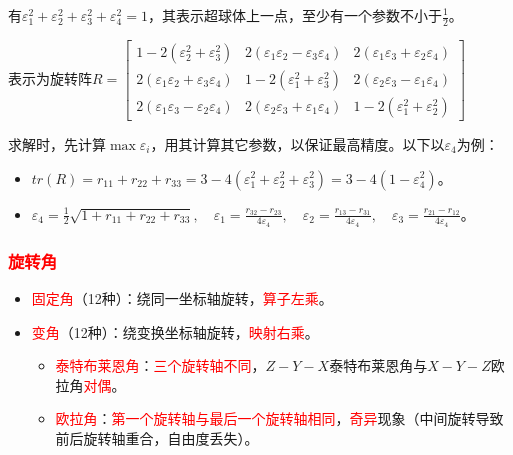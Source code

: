 \documentclass[
12pt, %
a4paper, 
oneside, %
]{scrartcl}
\begin{document}
有$ \varepsilon_1^2 + \varepsilon_2^2 + \varepsilon_3^2 + \varepsilon_4^2 = 1 $，其表示超球体上一点，至少有一个参数不小于$ \frac{1}{2} $。

表示为旋转阵$ R = \begin{bmatrix} 1 - 2(\varepsilon_2^2 + \varepsilon_3^2) & 2(\varepsilon_1 \varepsilon_2 - \varepsilon_3 \varepsilon_4) & 2(\varepsilon_1 \varepsilon_3 + \varepsilon_2 \varepsilon_4) \\ 2(\varepsilon_1 \varepsilon_2 + \varepsilon_3 \varepsilon_4) & 1 - 2(\varepsilon_1^2 + \varepsilon_3^2) & 2(\varepsilon_2 \varepsilon_3 - \varepsilon_1 \varepsilon_4) \\ 2(\varepsilon_1 \varepsilon_3 - \varepsilon_2 \varepsilon_4) & 2(\varepsilon_2 \varepsilon_3 + \varepsilon_1 \varepsilon_4) & 1 - 2(\varepsilon_1^2 + \varepsilon_2^2) \end{bmatrix} $

求解时，先计算$ \max{\varepsilon_i }$，用其计算其它参数，以保证最高精度。以下以$ \varepsilon_4 $为例：
\begin{itemize}
\item $ tr(R) = r_{11} + r_{22} + r_{33} = 3 - 4(\varepsilon_1^2 + \varepsilon_2^2 + \varepsilon_3^2) = 3 - 4(1 - \varepsilon_4^2) $。
\item $ \varepsilon_4 = \frac{1}{2} \sqrt{1 + r_{11} + r_{22} + r_{33}}, \quad \varepsilon_1 = \frac{r_{32} - r_{23}}{4 \varepsilon_4}, \quad \varepsilon_2 = \frac{r_{13} - r_{31}}{4 \varepsilon_4}, \quad \varepsilon_3 = \frac{r_{21} - r_{12}}{4 \varepsilon_4} $。
\end{itemize}
\subsubsection[旋转角]{\textcolor{red}{旋转角}}
\begin{itemize}
\item \textcolor{red}{固定角}（12种）：绕同一坐标轴旋转，\textcolor{red}{算子左乘}。
\item \textcolor{red}{变角}（12种）：绕变换坐标轴旋转，\textcolor{red}{映射右乘}。
\begin{itemize}
\item \textcolor{red}{泰特布莱恩角}：\textcolor{red}{三个旋转轴不同}，$ Z-Y-X $泰特布莱恩角与$ X-Y-Z $欧拉角\textcolor{red}{对偶}。
\item \textcolor{red}{欧拉角}：\textcolor{red}{第一个旋转轴与最后一个旋转轴相同}，\textcolor{red}{奇异}现象（中间旋转导致前后旋转轴重合，自由度丢失）。
\end{itemize}
\end{itemize}
\end{document}

